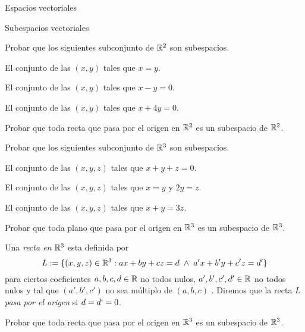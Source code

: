 \begin{chapter}{Espacios vectoriales}
\begin{section}{Subespacios vectoriales}
\begin{enumex}
        \item Probar que los siguientes subconjunto de $\mathbb R^2$ son subespacios.
        \begin{enumex}
            \item El conjunto de las $(x,y)$  tales que $x = y$.
            \item El conjunto de las $(x,y)$  tales que $x - y = 0$.
            \item El conjunto de las $(x,y)$  tales que $x + 4y = 0$.
        \end{enumex}
        \item Probar que toda recta que pasa por  el origen en $\mathbb R^2$ es un subespacio de $\mathbb R^2$. 
        \item Probar que los siguientes subconjunto de $\mathbb R^3$ son subespacios.
        \begin{enumex}
            \item El conjunto de las $(x,y,z)$  tales que $x + y + z = 0$.
            \item El conjunto de las $(x,y,z)$  tales que $x = y$ y $2y = z$.
            \item El conjunto de las $(x,y,z)$  tales que $x + y = 3z$.
        \end{enumex}
        \item Probar que toda plano que pasa por  el origen en $\mathbb R^3$ es un subespacio de $\mathbb R^3$. 
        \item Una \textit{recta en $\mathbb R^3$}  esta definida por
        $$
        L := \{(x,y,z) \in \mathbb R^3: ax +by +cz =d\; \wedge\; a'x +b'y +c'z =d' \}
        $$ 
        para ciertos  coeficientes $a,b,c,d \in \mathbb R$ no todos nulos,  $a',b',c',d' \in \mathbb R$ no todos nulos y tal que $(a',b',c')$ no sea múltiplo de $(a,b,c)$ . Diremos que la recta $L$ \textit{pasa por el origen} si $d=d`=0$.
        
        Probar que toda recta que pasa por el origen en $\mathbb R^3$ es un subespacio de $\mathbb R^3$. 


\end{enumex}
\end{section}
\end{chapter}
